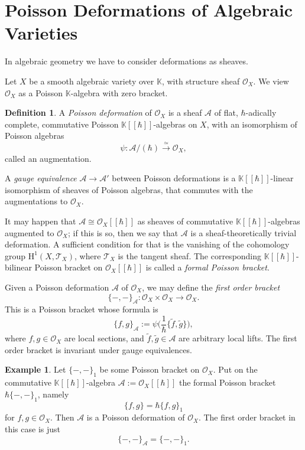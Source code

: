 \documentclass{conm-p-l}
\theoremstyle{definition}
\newtheorem{dfn}[equation]{Definition}
\newtheorem{exa}[equation]{Example}
\numberwithin{equation}{section}
\newcommand{\iso}{\stackrel{\simeq}{\longrightarrow}}
\newcommand{\mcal}[1]{\mathcal{#1}}
\newcommand{\mrm}[1]{\mathrm{#1}}
\newcommand{\mbb}[1]{\mathbb{#1}}
\newcommand{\til}[1]{\tilde{#1}}
\newcommand{\K}{\mbb{K}}
\newcommand{\smfrac}[2]{\textstyle \frac{#1}{#2}}
\begin{document}
\section{Poisson Deformations of Algebraic Varieties}

In algebraic geometry we have to consider deformations as sheaves. 

Let $X$ be a smooth algebraic variety over $\K$, with structure 
sheaf $\mcal{O}_{X}$. 
We view $\mcal{O}_{X}$ as a Poisson $\K$-algebra with zero bracket.

\begin{dfn}
A {\em Poisson deformation} of $\mcal{O}_X$ 
is a sheaf $\mcal{A}$ of flat, $\hbar$-adically complete,
commutative Poisson $\K[[\hbar]]$-algebras on $X$, with an 
isomorphism of Poisson algebras 
\[ \psi : \mcal{A} / (\hbar) \iso \mcal{O}_X , \]
called an augmentation. 

A {\em gauge equivalence} $\mcal{A} \to \mcal{A}'$
between Poisson deformations is a $\K[[\hbar]]$-linear 
isomorphism of sheaves of Poisson algebras, that commutes with the 
augmentations to $\mcal{O}_X$. 
\end{dfn}

It may happen that $\mcal{A} \cong \mcal{O}_X[[\hbar]]$ as sheaves of
commutative $\K[[\hbar]]$-algebras augmented to $\mcal{O}_X$; if this is so,
then we say that $\mcal{A}$ is a sheaf-theoretically trivial deformation.
A sufficient condition for that is the vanishing of the cohomology group 
$\mrm{H}^1(X, \mcal{T}_X)$, where $\mcal{T}_X$ is the tangent sheaf. 
The corresponding $\K[[\hbar]]$-bilinear Poisson bracket on
$\mcal{O}_X[[\hbar]]$ is called a {\em formal Poisson bracket}.

Given a Poisson deformation $\mcal{A}$ of $\mcal{O}_X$, we 
may define the {\em first order bracket}
\[ \{ -,- \}_{\mcal{A}} :  \mcal{O}_X \times \mcal{O}_X \to \mcal{O}_X
. \]
This is a Poisson bracket whose formula is
\[ \{ f,g \}_{\mcal{A}} := \psi \bigl( \smfrac{1}{\hbar} \{ \til{f},
\til{g} 
\} \bigr) , \]
where $f, g \in \mcal{O}_X$ are local sections, and 
$\til{f}, \til{g} \in \mcal{A}$ are arbitrary local lifts. %
The first order bracket  is invariant under gauge equivalences. 

\begin{exa} \label{exa10}
Let $\{ -,- \}_1$ be some Poisson bracket on $\mcal{O}_{X}$. 
Put on the commutative $\K[[\hbar]]$-algebra 
$\mcal{A} := \mcal{O}_X [[\hbar]]$
the formal Poisson bracket
$\hbar \{ -,- \}_1$, namely 
\[ \{ f, g \} = \hbar \{ f, g \}_1  \]
for $f, g \in \mcal{O}_X$. 
Then $\mcal{A}$ is a Poisson deformation of $\mcal{O}_X$. The first
order bracket in this case is just
\[ \{ -,- \}_{\mcal{A}} = \{ -,- \}_{1} . \]
\end{exa}
\end{document}
